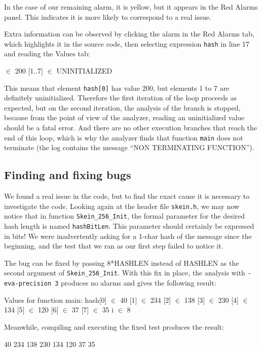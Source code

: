 \documentclass{frama-c-book}
\begin{document}
In the case of our remaining alarm, it is yellow, but it appears in the
Red Alarms panel. This indicates it is more likely to correspond to a real
issue.

Extra information can be observed by clicking the alarm in the Red Alarms tab,
which highlights it in the source code, then selecting expression
\lstinline|hash| in line 17 and reading the \textsf{Values} tab:
\begin{logs}
  [0] $\in$ {200}
  [1..7] $\in$ UNINITIALIZED
\end{logs}
This means that element \lstinline|hash[0]| has value 200, but elements 1 to 7
are definitely uninitialized. Therefore the first iteration of the loop
proceeds as expected, but on the second iteration, the analysis of the branch
is stopped, because
from the point of view of the analyzer, reading an uninitialized
value should be a fatal error. And there are no other execution
branches that reach the end of this loop, which is why the analyzer
finds that function \lstinline|main| does not terminate (the log contains
the message ``NON TERMINATING FUNCTION'').

\subsection{Finding and fixing bugs}

We found a real issue in the code, but to find the exact cause it is necessary
to investigate the code.
Looking again at the header file \lstinline|skein.h|, we may now
notice that in function \lstinline|Skein_256_Init|,
the formal parameter for the desired hash length is named
\lstinline|hashBitLen|. This parameter should certainly be expressed in bits!
We were inadvertently asking for a 1-char hash of the message
since the beginning, and the test that we ran as our first
step failed to notice it.

The bug can be fixed by passing
8*HASHLEN instead of HASHLEN as the second argument of
\lstinline|Skein_256_Init|.
With this fix in place, the analysis
with \lstinline|-eva-precision 3| produces no alarms and gives the following
result:
\begin{logs}
Values for function main:
  hash[0] $\in$ {40}
      [1] $\in$ {234}
      [2] $\in$ {138}
      [3] $\in$ {230}
      [4] $\in$ {134}
      [5] $\in$ {120}
      [6] $\in$ {37}
      [7] $\in$ {35}
  i $\in$ {8}
\end{logs}

Meanwhile, compiling and executing the fixed test produces the result:
\begin{logs}
40
234
138
230
134
120
37
35
\end{logs}
\end{document}
